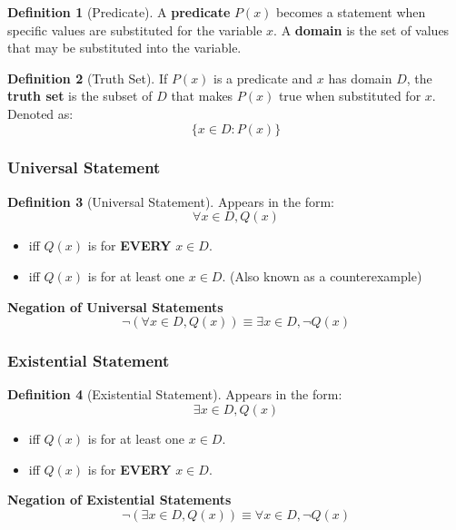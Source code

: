\documentclass{article}
\theoremstyle{plain}
\theoremstyle{definition}
\newtheorem*{definition}{Definition}
\theoremstyle{remark}
\begin{document}
\begin{definition}[Predicate]
A \textbf{predicate} $P(x)$ becomes a statement when specific values are substituted for the variable $x$. A \textbf{domain} is the set of values that may be substituted into the variable.
\end{definition}

\begin{definition}[Truth Set]
If $P(x)$ is a predicate and $x$ has domain $D$, the \textbf{truth set} is the subset of $D$ that makes $P(x)$ true when substituted for $x$. Denoted as:
\[ \{x \in D : P(x)\} \]
\end{definition}

\subsubsection{Universal Statement}
\begin{definition}[Universal Statement]
Appears in the form:
\[ \forall x \in D, Q(x) \]
\begin{itemize}
    \item \textcolor{blue}{} iff $Q(x)$ is \textcolor{blue}{} for \textbf{EVERY} $x \in D$.
    \item \textcolor{red}{} iff $Q(x)$ is \textcolor{red}{} for at least one $x \in D$. (Also known as a counterexample)
\end{itemize}
\textbf{Negation of Universal Statements}
\[ \neg(\forall x \in D, Q(x)) \equiv \exists x \in D, \neg Q(x) \]
\end{definition}

\subsubsection{Existential Statement}
\begin{definition}[Existential Statement]
Appears in the form:
\[ \exists x \in D, Q(x) \]
\begin{itemize}
    \item \textcolor{blue}{} iff $Q(x)$ is \textcolor{blue}{} for at least one $x \in D$.
    \item \textcolor{red}{} iff $Q(x)$ is \textcolor{red}{} for \textbf{EVERY} $x \in D$.
\end{itemize}
\textbf{Negation of Existential Statements}
\[ \neg(\exists x \in D, Q(x)) \equiv \forall x \in D, \neg Q(x) \]
\end{definition}
\end{document}

